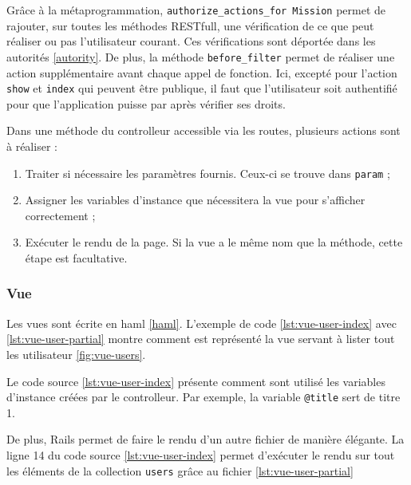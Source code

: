 Grâce à la métaprogrammation, \lstinline[language=Rails]{authorize_actions_for Mission} permet de rajouter, sur toutes les méthodes RESTfull, une vérification de ce que peut réaliser ou pas l'utilisateur courant. Ces vérifications sont déportée dans les autorités \ref{autority}. De plus, la méthode \lstinline[language=Rails]{before_filter} permet de réaliser une action supplémentaire avant chaque appel de fonction. Ici, excepté pour l'action \texttt{show} et \texttt{index} qui peuvent être publique, il faut que l'utilisateur soit authentifié pour que l'application puisse par après vérifier ses droits.

Dans une méthode du controlleur accessible via les routes, plusieurs actions sont à réaliser :
\begin{enumerate}
  \item Traiter si nécessaire les paramètres fournis. Ceux-ci se trouve dans \lstinline[language=Rails]{param} ;
  \item Assigner les variables d'instance que nécessitera la vue pour s'afficher correctement ;
  \item Exécuter le rendu de la page. Si la vue a le même nom que la méthode, cette étape est facultative.
\end{enumerate}

\subsubsection{Vue}
Les vues sont écrite en haml \ref{haml}. L'exemple de code \ref{lst:vue-user-index} avec \ref{lst:vue-user-partial} montre comment est représenté la vue servant à lister tout les utilisateur \ref{fig:vue-users}.


Le code source \ref{lst:vue-user-index} présente comment sont utilisé les variables d'instance créées par le controlleur. Par exemple, la variable \texttt{@title} sert de titre 1.


De plus, Rails permet de faire le rendu d'un autre fichier de manière élégante. La ligne 14 du code source \ref{lst:vue-user-index} permet d'exécuter le rendu sur tout les éléments de la collection \texttt{users} grâce au fichier \ref{lst:vue-user-partial}

